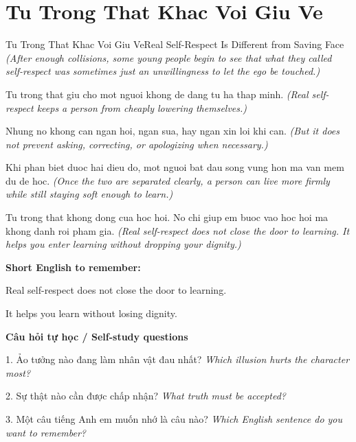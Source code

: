 \section{Tu Trong That Khac Voi Giu Ve}
\begin{truyen}{Tu Trong That Khac Voi Giu Ve}{Real Self-Respect Is Different from Saving Face}
\textit{(After enough collisions, some young people begin to see that what they called self-respect was sometimes just an unwillingness to let the ego be touched.)}

Tu trong that giu cho mot nguoi khong de dang tu ha thap minh.
\textit{(Real self-respect keeps a person from cheaply lowering themselves.)}

Nhung no khong can ngan hoi, ngan sua, hay ngan xin loi khi can.
\textit{(But it does not prevent asking, correcting, or apologizing when necessary.)}

Khi phan biet duoc hai dieu do, mot nguoi bat dau song vung hon ma van mem du de hoc.
\textit{(Once the two are separated clearly, a person can live more firmly while still staying soft enough to learn.)}

\end{truyen}

\begin{baihoc}
Tu trong that khong dong cua hoc hoi. No chi giup em buoc vao hoc hoi ma khong danh roi pham gia.
\textit{(Real self-respect does not close the door to learning. It helps you enter learning without dropping your dignity.)}
\end{baihoc}

\begin{ghinhoanh}
\textbf{Short English to remember:}

Real self-respect does not close the door to learning.

It helps you learn without losing dignity.

\end{ghinhoanh}

\begin{tuhocnhanh}
\textbf{Câu hỏi tự học / Self-study questions}

1. Ảo tưởng nào đang làm nhân vật đau nhất? \textit{Which illusion hurts the character most?}

2. Sự thật nào cần được chấp nhận? \textit{What truth must be accepted?}

3. Một câu tiếng Anh em muốn nhớ là câu nào? \textit{Which English sentence do you want to remember?}
\end{tuhocnhanh}
\ngancach

